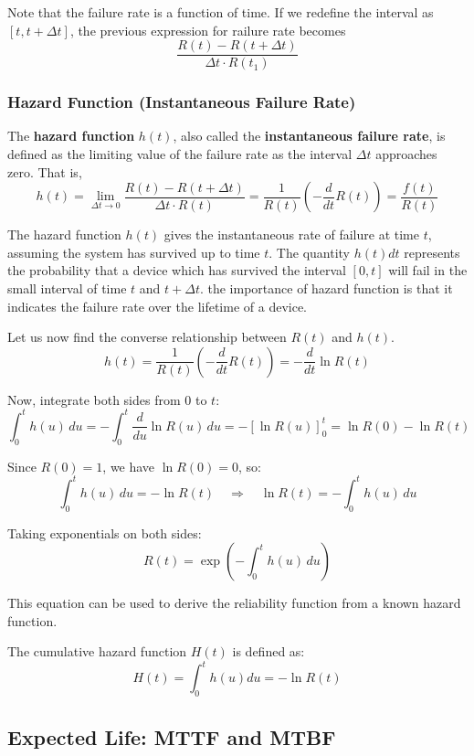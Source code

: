 \documentclass[twoside]{book}
\begin{document}
Note that the failure rate is a function of time. If we redefine the interval as $[t, t+\Delta t]$, the previous expression for railure rate becomes
\[
\dfrac{R(t) - R(t+\Delta t)}{\Delta t \cdot R(t_1)}
\]


\subsubsection{Hazard Function (Instantaneous Failure Rate)}

The \textbf{hazard function} $h(t)$, also called the \textbf{instantaneous failure rate}, is defined as the limiting value of the failure rate as the interval $\Delta t$ approaches zero. That is,
\[
h(t) = \lim_{\Delta t \to 0} \dfrac{R(t) - R(t+\Delta t)}{\Delta t \cdot R(t)} = \dfrac{1}{R(t)} \left(-\dfrac{d}{dt} R(t) \right) = \dfrac{f(t)}{R(t)}
\]

The hazard function $h(t)$ gives the instantaneous rate of failure at time $t$, assuming the system has survived up to time $t$.
The quantity $h(t)dt$ represents the probability that a device which has survived the interval $[0,t]$ will fail in the small interval of time $t$ and $t+\Delta t$. the importance of hazard function is that it indicates the failure rate over the lifetime of a device.

Let us now find the converse relationship between $R(t)$ and $h(t)$.
$$h(t)=\dfrac{1}{R(t)} \left(-\dfrac{d}{dt} R(t) \right) = -\dfrac{d}{dt} \ln R(t)$$

Now, integrate both sides from \(0\) to \(t\):
\[
\int_0^t h(u)\,du = -\int_0^t \frac{d}{du} \ln R(u)\,du = -\left[ \ln R(u) \right]_0^t = \ln R(0) - \ln R(t)
\]

Since \( R(0) = 1 \), we have \( \ln R(0) = 0 \), so:
\[
\int_0^t h(u)\,du = -\ln R(t)
\quad \Rightarrow \quad
\ln R(t) = -\int_0^t h(u)\,du
\]

Taking exponentials on both sides:
\[
R(t) = \exp\left( -\int_0^t h(u)\,du \right)
\]

This equation can be used to derive the reliability function from a known hazard function.

The cumulative hazard function $H(t)$ is defined as:
\begin{equation*}
H(t) = \int_0^t h(u) du = -\ln R(t)
\end{equation*}

\subsection{Expected Life: MTTF and MTBF}
\end{document}
